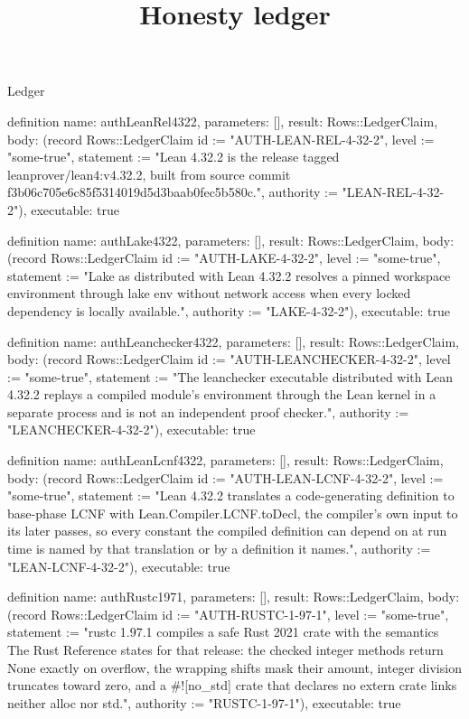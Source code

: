 \begin{lexlean}{Ledger}
\title{Honesty ledger}
\begin{semanticmodule}
definition{
  name: authLeanRel4322,
  parameters: [],
  result: Rows::LedgerClaim,
  body: (record Rows::LedgerClaim {id := "AUTH-LEAN-REL-4-32-2", level := "some-true", statement := "Lean 4.32.2 is the release tagged leanprover/lean4:v4.32.2, built from source commit f3b06c705e6c85f5314019d5d3baab0fec5b580c.", authority := "LEAN-REL-4-32-2"}),
  executable: true
}

definition{
  name: authLake4322,
  parameters: [],
  result: Rows::LedgerClaim,
  body: (record Rows::LedgerClaim {id := "AUTH-LAKE-4-32-2", level := "some-true", statement := "Lake as distributed with Lean 4.32.2 resolves a pinned workspace environment through lake env without network access when every locked dependency is locally available.", authority := "LAKE-4-32-2"}),
  executable: true
}

definition{
  name: authLeanchecker4322,
  parameters: [],
  result: Rows::LedgerClaim,
  body: (record Rows::LedgerClaim {id := "AUTH-LEANCHECKER-4-32-2", level := "some-true", statement := "The leanchecker executable distributed with Lean 4.32.2 replays a compiled module's environment through the Lean kernel in a separate process and is not an independent proof checker.", authority := "LEANCHECKER-4-32-2"}),
  executable: true
}

definition{
  name: authLeanLcnf4322,
  parameters: [],
  result: Rows::LedgerClaim,
  body: (record Rows::LedgerClaim {id := "AUTH-LEAN-LCNF-4-32-2", level := "some-true", statement := "Lean 4.32.2 translates a code-generating definition to base-phase LCNF with Lean.Compiler.LCNF.toDecl, the compiler's own input to its later passes, so every constant the compiled definition can depend on at run time is named by that translation or by a definition it names.", authority := "LEAN-LCNF-4-32-2"}),
  executable: true
}

definition{
  name: authRustc1971,
  parameters: [],
  result: Rows::LedgerClaim,
  body: (record Rows::LedgerClaim {id := "AUTH-RUSTC-1-97-1", level := "some-true", statement := "rustc 1.97.1 compiles a safe Rust 2021 crate with the semantics The Rust Reference states for that release: the checked integer methods return None exactly on overflow, the wrapping shifts mask their amount, integer division truncates toward zero, and a #![no_std] crate that declares no extern crate links neither alloc nor std.", authority := "RUSTC-1-97-1"}),
  executable: true
}


\end{semanticmodule}
\end{lexlean}
